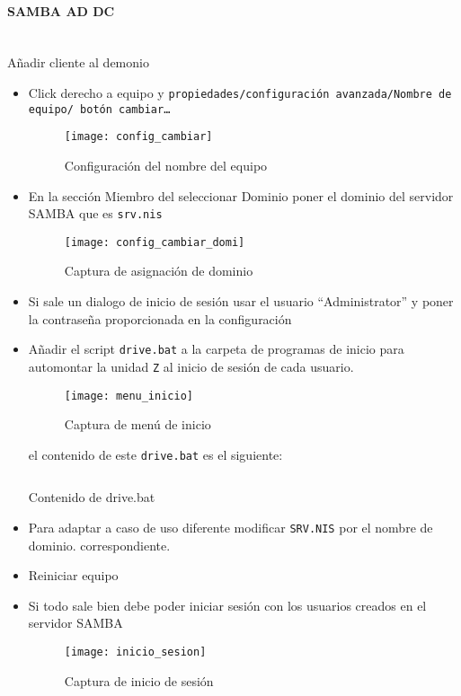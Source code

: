 \documentclass[../main.tex]{subfiles}
\begin{document}
\paragraph{SAMBA AD DC}
\ \\
Añadir cliente al demonio
\begin{itemize}
  \item Click derecho a equipo y \texttt{propiedades/configuración avanzada/Nombre de equipo/ botón cambiar\ldots}
        \begin{figure}[H]
          \centering
          \texttt{[image: config\_cambiar]}
          \caption{Configuración del nombre del equipo}\label{fig:config_cambiar}
        \end{figure}
        \newpage{}

  \item En la sección Miembro del seleccionar Dominio poner el dominio del servidor \Gls{SAMBA} que es \texttt{srv.nis}
        \begin{figure}[H]
          \centering
          \texttt{[image: config\_cambiar\_domi]}
          \caption{Captura de asignación de dominio}\label{fig:config_cambiar_domi}
        \end{figure}
        \newpage{}
  \item Si sale un dialogo de inicio de sesión usar el usuario ``Administrator''
        y poner la contraseña proporcionada en la configuración
  \item Añadir el script \texttt{drive.bat} a la carpeta de programas
        de inicio para automontar la unidad \texttt{Z} al inicio de sesión de
        cada usuario.
        \begin{figure}[H]
          \centering
          \texttt{[image: menu\_inicio]}
          \caption{Captura de menú de inicio}\label{fig:menu_inicio}
        \end{figure}

        el contenido de este \texttt{drive.bat} es el siguiente:


        \begin{listing}[H]
          \inputminted{bat}{../configs/drive.bat}
          \caption{Contenido de drive.bat}
          \label{listing:drive.sh}
        \end{listing}


  \item Para adaptar a caso de uso diferente
        modificar \texttt{SRV.NIS} por el nombre de dominio.
        correspondiente.
  \item Reiniciar equipo
        \newpage{}
  \item Si todo sale bien debe poder iniciar sesión con los
        usuarios creados en el servidor \Gls{SAMBA}
        \begin{figure}[H]
          \centering
          \texttt{[image: inicio\_sesion]}
          \caption{Captura de inicio de sesión}\label{fig:inicio_sesion}
        \end{figure}


\end{itemize}
\end{document}
